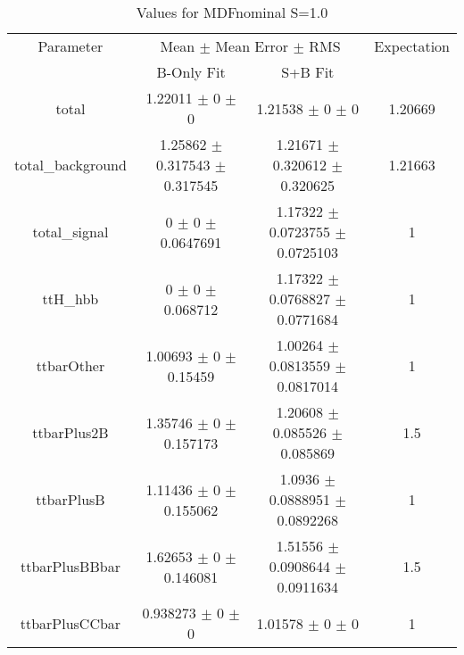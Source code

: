 \begin{table}
\centering
\caption{Values for MDFnominal S=1.0}
\begin{tabular}{cccc}
\toprule
Parameter & \multicolumn{2}{c}{Mean $\pm$ Mean Error $\pm$ RMS} & Expectation\\
 & B-Only Fit & S+B Fit & \\
\midrule
total & \num{1.22011} $\pm$ \num{0} $\pm$ \num{0} & \num{1.21538} $\pm$ \num{0} $\pm$ \num{0} & \num{1.20669}\\
total\_background & \num{1.25862} $\pm$ \num{0.317543} $\pm$ \num{0.317545} & \num{1.21671} $\pm$ \num{0.320612} $\pm$ \num{0.320625} & \num{1.21663}\\
total\_signal & \num{0} $\pm$ \num{0} $\pm$ \num{0.0647691} & \num{1.17322} $\pm$ \num{0.0723755} $\pm$ \num{0.0725103} & \num{1}\\
ttH\_hbb & \num{0} $\pm$ \num{0} $\pm$ \num{0.068712} & \num{1.17322} $\pm$ \num{0.0768827} $\pm$ \num{0.0771684} & \num{1}\\
ttbarOther & \num{1.00693} $\pm$ \num{0} $\pm$ \num{0.15459} & \num{1.00264} $\pm$ \num{0.0813559} $\pm$ \num{0.0817014} & \num{1}\\
ttbarPlus2B & \num{1.35746} $\pm$ \num{0} $\pm$ \num{0.157173} & \num{1.20608} $\pm$ \num{0.085526} $\pm$ \num{0.085869} & \num{1.5}\\
ttbarPlusB & \num{1.11436} $\pm$ \num{0} $\pm$ \num{0.155062} & \num{1.0936} $\pm$ \num{0.0888951} $\pm$ \num{0.0892268} & \num{1}\\
ttbarPlusBBbar & \num{1.62653} $\pm$ \num{0} $\pm$ \num{0.146081} & \num{1.51556} $\pm$ \num{0.0908644} $\pm$ \num{0.0911634} & \num{1.5}\\
ttbarPlusCCbar & \num{0.938273} $\pm$ \num{0} $\pm$ \num{0} & \num{1.01578} $\pm$ \num{0} $\pm$ \num{0} & \num{1}\\
\bottomrule
\end{tabular}
\end{table}